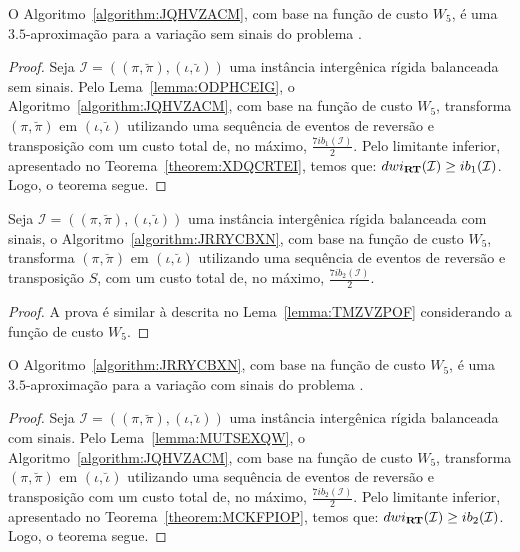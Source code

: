 \begin{theorem}\label{theorem:SEJEYSUH}
O Algoritmo~\ref{algorithm:JQHVZACM}, com base na função de custo $W_5$, é uma $3.5$-aproxima\-ção para a variação sem sinais do problema \SbWIRT{}.
\end{theorem}
\begin{proof}
Seja $\mathcal{I} = ((\pi,\breve\pi),(\iota,\breve\iota))$ uma instância intergênica rígida balanceada sem sinais. Pelo Lema~\ref{lemma:ODPHCEIG}, o Algoritmo~\ref{algorithm:JQHVZACM}, com base na função de custo $W_5$, transforma $(\pi,\breve\pi)$ em $(\iota,\breve\iota)$ utilizando uma sequência de eventos de reversão e transposição com um custo total de, no máximo, $\frac{7ib_1(\mathcal{I})}{2}$. Pelo limitante inferior, apresentado no Teorema~\ref{theorem:XDQCRTEI}, temos que: $dwi_{\textbf{RT}}(\mathcal{I}) \ge ib_1(\mathcal{I})$. Logo, o teorema segue.
\end{proof}

\begin{lemma}\label{lemma:MUTSEXQW}
Seja $\mathcal{I} = ((\pi,\breve\pi),(\iota,\breve\iota))$ uma instância intergênica rígida balanceada com sinais, o Algoritmo~\ref{algorithm:JRRYCBXN}, com base na função de custo $W_5$, transforma $(\pi,\breve\pi)$ em $(\iota,\breve\iota)$ utilizando uma sequência de eventos de reversão e transposição $S$, com um custo total de, no máximo, $\frac{7ib_2(\mathcal{I})}{2}$.
\end{lemma}
\begin{proof}
A prova é similar à descrita no Lema~\ref{lemma:TMZVZPOF} considerando a função de custo $W_5$.
\end{proof}

\begin{theorem}\label{theorem:ZYFESTTM}
O Algoritmo~\ref{algorithm:JRRYCBXN}, com base na função de custo $W_5$, é uma $3.5$-aproxima\-ção para a variação com sinais do problema \SbWIRT{}.
\end{theorem}
\begin{proof}
Seja $\mathcal{I} = ((\pi,\breve\pi),(\iota,\breve\iota))$ uma instância intergênica rígida balanceada com sinais. Pelo Lema~\ref{lemma:MUTSEXQW}, o Algoritmo~\ref{algorithm:JQHVZACM}, com base na função de custo $W_5$, transforma $(\pi,\breve\pi)$ em $(\iota,\breve\iota)$ utilizando uma sequência de eventos de reversão e transposição com um custo total de, no máximo, $\frac{7ib_2(\mathcal{I})}{2}$. Pelo limitante inferior, apresentado no Teorema~\ref{theorem:MCKFPIOP}, temos que: $dwi_{\textbf{RT}}(\mathcal{I}) \ge ib_2(\mathcal{I})$. Logo, o teorema segue.
\end{proof}


